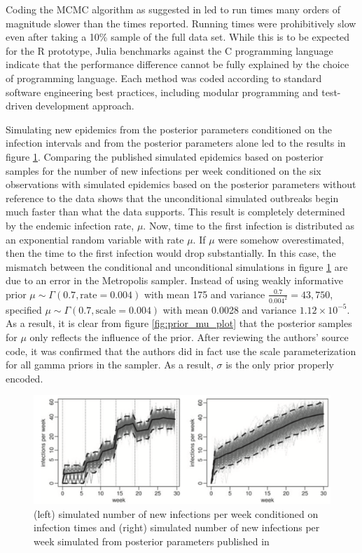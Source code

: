 \documentclass{uwstat572}
\begin{document}
Coding the MCMC algorithm as suggested in \citet{Brown} led to run times many orders of magnitude slower than the times reported. 
Running times were prohibitively slow even after taking a 10\% sample of the full data set. 
While this is to be expected for the R prototype, Julia benchmarks against the C programming language indicate that the performance difference cannot be fully explained by the choice of programming language. 
Each method was coded according to standard software engineering best practices, including modular programming and test-driven development approach.  

Simulating new epidemics from the posterior parameters conditioned on the infection intervals and from the posterior parameters alone led \citet{Brown} to the results in figure \ref{fig:post_sim_plot}. 
Comparing the published simulated epidemics based on posterior samples for the number of new infections per week conditioned on the six observations with simulated epidemics based on the posterior parameters without reference to the data shows that the unconditional simulated outbreaks begin much faster than what the data supports. 
This result is completely determined by the endemic infection rate, $\mu$. 
Now, time to the first infection is distributed as an exponential random variable with rate $\mu$. 
If $\mu$ were somehow overestimated, then the time to the first infection would drop substantially.
In this case, the mismatch between the conditional and unconditional simulations in figure \ref{fig:post_sim_plot} are due to an error in the Metropolis sampler. 
Instead of using weakly informative prior $\mu \sim \Gamma(0.7, \text{rate}=0.004)$ with mean 175 and variance $\frac{0.7}{0.004^2}=43,750$, \citep{Brown} specified $\mu \sim \Gamma(0.7, \text{scale}=0.004)$ with mean 0.0028 and variance $1.12\times10^{-5}$. 
As a result, it is clear from figure \ref{fig:prior_mu_plot} that the posterior samples for $\mu$ only reflects the influence of the prior. 
After reviewing the authors' source code, it was confirmed that the authors did in fact use the scale parameterization for all gamma priors in the sampler. 
As a result, $\sigma$ is the only prior properly encoded. 

\begin{figure}[H]
\centering
\includegraphics[height=0.36\linewidth, keepaspectratio]{figures/brown_figure_4.png}
\caption{(left) simulated number of new infections per week conditioned on infection times and (right) simulated number of new infections per week simulated from posterior parameters published in  \citet{Brown} }
\label{fig:post_sim_plot}
\end{figure} 
\end{document}

